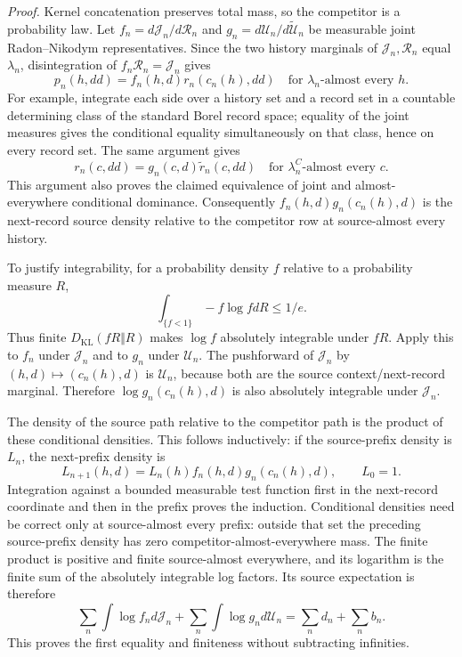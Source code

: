 \documentclass[11pt,letterpaper]{report}
\newcommand{\KL}{D_{\mathrm{KL}}}
\begin{document}
\noindent\emph{Proof.}
Kernel concatenation preserves total mass, so the competitor is a probability law. Let
$f_n=d\mathcal J_n/d\mathcal R_n$ and
$g_n=d\mathcal U_n/d\widetilde{\mathcal U}_n$ be measurable joint Radon--Nikodym representatives. Since the two history marginals of $\mathcal J_n,\mathcal R_n$ equal $\lambda_n$, disintegration of $f_n\mathcal R_n=\mathcal J_n$ gives
\[
 p_n(h,dd)=f_n(h,d)r_n(c_n(h),dd)
 \quad\text{for }\lambda_n\text{-almost every }h.
\]
For example, integrate each side over a history set and a record set in a countable determining class of the standard Borel record space; equality of the joint measures gives the conditional equality simultaneously on that class, hence on every record set. The same argument gives
\[
 r_n(c,dd)=g_n(c,d)\widetilde r_n(c,dd)
 \quad\text{for }\lambda_n^C\text{-almost every }c.
\]
This argument also proves the claimed equivalence of joint and almost-everywhere conditional dominance. Consequently $f_n(h,d)g_n(c_n(h),d)$ is the next-record source density relative to the competitor row at source-almost every history.

To justify integrability, for a probability density $f$ relative to a probability measure $R$,
\[
 \int_{\{f<1\}}-f\log f dR\le1/e.
\]
Thus finite $\KL(fR\Vert R)$ makes $\log f$ absolutely integrable under $fR$. Apply this to $f_n$ under $\mathcal J_n$ and to $g_n$ under $\mathcal U_n$. The pushforward of $\mathcal J_n$ by $(h,d)\mapsto(c_n(h),d)$ is $\mathcal U_n$, because both are the source context/next-record marginal. Therefore $\log g_n(c_n(h),d)$ is also absolutely integrable under $\mathcal J_n$.

The density of the source path relative to the competitor path is the product of these conditional densities. This follows inductively: if the source-prefix density is $L_n$, the next-prefix density is
\[
 L_{n+1}(h,d)=L_n(h)f_n(h,d)g_n(c_n(h),d),
 \qquad L_0=1.
\]
Integration against a bounded measurable test function first in the next-record coordinate and then in the prefix proves the induction. Conditional densities need be correct only at source-almost every prefix: outside that set the preceding source-prefix density has zero competitor-almost-everywhere mass. The finite product is positive and finite source-almost everywhere, and its logarithm is the finite sum of the absolutely integrable log factors. Its source expectation is therefore
\[
 \sum_n\int\log f_n d\mathcal J_n
 +\sum_n\int\log g_n d\mathcal U_n
 =\sum_n d_n+\sum_n b_n.
\]
This proves the first equality and finiteness without subtracting infinities.
\end{document}
